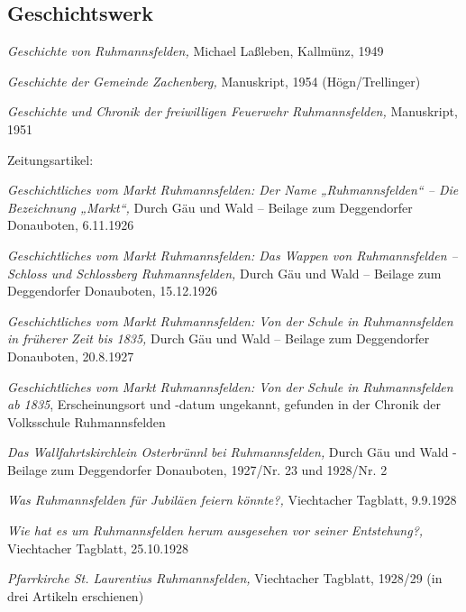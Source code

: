 \subsection{Geschichtswerk}

\textit{Geschichte von Ruhmannsfelden,} Michael Laßleben, Kallmünz, 1949

\textit{Geschichte der Gemeinde Zachenberg,} Manuskript, 1954
(Högn/Trellinger)

\textit{Geschichte und Chronik der freiwilligen Feuerwehr
Ruhmannsfelden,} Manuskript, 1951

Zeitungsartikel:

\textit{Geschichtliches vom Markt Ruhmannsfelden: Der Name
„Ruhmannsfelden“ – Die Bezeichnung „Markt“,} Durch Gäu und Wald –
Beilage zum Deggendorfer Donauboten, 6.11.1926

\textit{Geschichtliches vom Markt Ruhmannsfelden: Das Wappen von
Ruhmannsfelden – Schloss und Schlossberg Ruhmannsfelden,} Durch Gäu und
Wald – Beilage zum Deggendorfer Donauboten, 15.12.1926

\textit{Geschichtliches vom Markt Ruhmannsfelden: Von der Schule in
Ruhmannsfelden in früherer Zeit bis 1835,} Durch Gäu und Wald – Beilage
zum Deggendorfer Donauboten, 20.8.1927

\textit{Geschichtliches vom Markt Ruhmannsfelden: Von der Schule in
Ruhmannsfelden ab 1835}, Erscheinungsort und -datum ungekannt, gefunden
in der Chronik der Volksschule Ruhmannsfelden

\textit{Das Wallfahrtskirchlein Osterbrünnl bei Ruhmannsfelden,} Durch
Gäu und Wald - Beilage zum Deggendorfer Donauboten, 1927/Nr. 23 und
1928/Nr. 2

\textit{Was Ruhmannsfelden für Jubiläen feiern könnte?,} Viechtacher
Tagblatt, 9.9.1928

\textit{Wie hat es um Ruhmannsfelden herum ausgesehen vor seiner
Entstehung?,} Viechtacher Tagblatt, 25.10.1928

\textit{Pfarrkirche St. Laurentius Ruhmannsfelden,} Viechtacher
Tagblatt, 1928/29 (in drei Artikeln erschienen)
